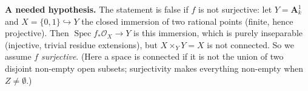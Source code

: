 \documentclass[11pt]{article}
\begin{document}
\pf
\textbf{A needed hypothesis.} The statement is false if $f$ is not surjective: let $Y=\mathbf A^1_k$ and $X=\{0,1\}\hookrightarrow Y$ the closed immersion of two rational points (finite, hence projective). Then $\operatorname{Spec}f_*\mathcal O_X\to Y$ is this immersion, which is purely inseparable (injective, trivial residue extensions), but $X\times_YY=X$ is not connected. So we assume $f$ \emph{surjective}. (Here a space is connected if it is not the union of two disjoint non-empty open subsets; surjectivity makes everything non-empty when $Z\ne\emptyset$.)
\end{document}
